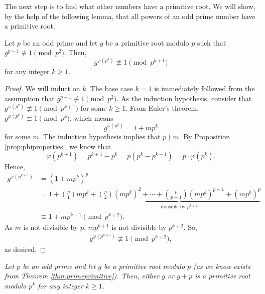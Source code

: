 \documentclass{subfile}
\begin{document}
The next step is to find what other numbers have a primitive root. We will show, by the help of the following lemma, that all powers of an odd prime number have a primitive root.

	\begin{lemma}
		Let $p$ be an odd prime and let $g$ be a primitive root modulo $p$ such that $g^{p-1} \not \equiv 1 \pmod{p^2}$. Then, $$g^{\varphi(p^k)} \not \equiv 1 \pmod{p^{k+1}}$$ for any integer $k \geq 1$.
	\end{lemma}

	\begin{proof}
		We will induct on $k$. The base case $k=1$ is immediately followed from the assumption that $g^{p-1} \not \equiv 1 \pmod{p^2}$. As the induction hypothesis, consider that $g^{\varphi(p^k)} \not \equiv 1 \pmod{p^{k+1}}$ for some $k\geq 1$. From Euler's theorem, $g^{\varphi(p^k)} \equiv 1 \pmod{p^k}$, which means $$g^{\varphi(p^k)} = 1+mp^k$$ for some $m$. The induction hypothesis implies that $p \nmid m$. By Proposition \ref{prop:phiproperties}, we know that $$\varphi(p^{k+1})=p^{k+1}-p^k=p\left(p^k - p^{k-1}\right)=p\cdot \varphi(p^k).$$
		Hence,
			\begin{align*}
				g^{\varphi(p^{k+1})}
					&= (1+mp^k)^p \\
					&= 1+ \binom{p}{1}mp^k + \underbrace{\binom{p}{2} (mp^k)^2 + \cdots +\binom{p}{p-1} (mp^k)^{p-1} +(mp^k)^p}_{\mbox{divisible by }p^{k+2}}\\
								&\equiv 1+mp^{k+1} \pmod {p^{k+2}}.
			\end{align*}
		As $m$ is not divisible by $p$, $mp^{k+1}$ is not divisible by $p^{k+2}$. So,
			\begin{align*}
				g^{\varphi(p^{k+1})} \not \equiv 1 \pmod {p^{k+2}},
			\end{align*}
		as desired.
	\end{proof}

	\begin{theorem}\slshape\label{thm:primepowerprimitive}
		Let $p$ be an odd prime and let $g$ be a primitive root modulo $p$ (as we know exists from Theorem \ref{thm:primeprimitive}). Then, either $g$ or $g+p$ is a primitive root modulo $p^k$ for any integer $k\geq 1$.
	\end{theorem}
\end{document}
